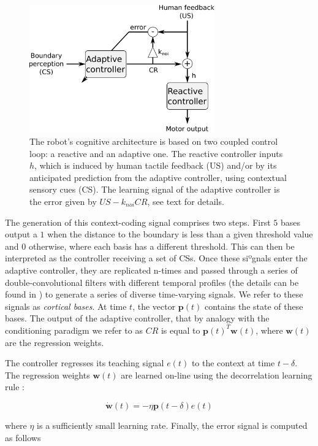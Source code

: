 \documentclass[letterpaper, 10 pt, conference]{ieeeconf}  %
\begin{document}
\begin{figure}[!t]
\centering
\includegraphics[width=8cm]{architecture}
\caption{The robot's cognitive architecture is based on two coupled control loop: a reactive and an adaptive one. The reactive controller inputs $h$, which is induced by human tactile feedback (US) and/or by its anticipated prediction from the adaptive controller, using contextual sensory cues (CS). The learning signal of the adaptive controller is the error given by $US - k_{noi}CR$, see text for details.}
\label{fig:architecture}
\end{figure}

The generation of this context-coding signal comprises two steps. First $5$ bases output a $1$ when the distance to the boundary is less than a given threshold value and $0$ otherwise, where each basis has a different threshold. This can then be interpreted as the controller receiving a set of CSs. Once these siºgnals enter the adaptive controller, they are replicated n-times and passed through a series of double-convolutional filters with different temporal profiles (the details can be found in \cite{herreros2013speed}) to generate a series of diverse time-varying signals. We refer to these signals as \emph{cortical bases}. At time $t$, the vector $\mathbf{p}(t)$ contains the state of these bases. The output of the adaptive controller, that by analogy with the conditioning paradigm we refer to as $CR$ is equal to $\mathbf{p}(t)^T \mathbf{w}(t)$, where $\mathbf{w}(t)$ are the regression weights.

The controller regresses its teaching signal $e(t)$ to the context at time $t-\delta$. The regression weights $\mathbf{w}(t)$ are learned on-line using the decorrelation learning rule \cite{fujita1982adaptive}:

\[
\dot{\mathbf{w}}(t) = -\eta \mathbf{p}(t-\delta) e(t)
\]

where $\eta$ is a sufficiently small learning rate. Finally, the error signal is computed as follows
\end{document}
